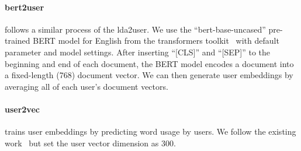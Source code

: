 \paragraph{bert2user} 
follows a similar process of the lda2user. We use the ``bert-base-uncased'' pre-trained BERT model
for English from the transformers toolkit~\cite{Wolf2019HuggingFacesTS} with default parameter and model settings. After inserting ``[CLS]'' and ``[SEP]'' to the beginning and end of each document, the BERT model encodes a document into a fixed-length (768) document vector. We can then generate user embeddings by averaging all of each user's document vectors.


\paragraph{user2vec} trains user embeddings by predicting word usage by users.
We follow the existing work~\cite{amir2017quantifying} but set the user vector dimension as 300.


\begin{table}[htp]
\centering
{}
\caption{Performance summary of different user embedding models. We report F1 scores at multiple numbers of clusters. The bold fonts indicate the best performance in each evaluation task.}
\label{chap4:tab:usereval}
\end{table}


